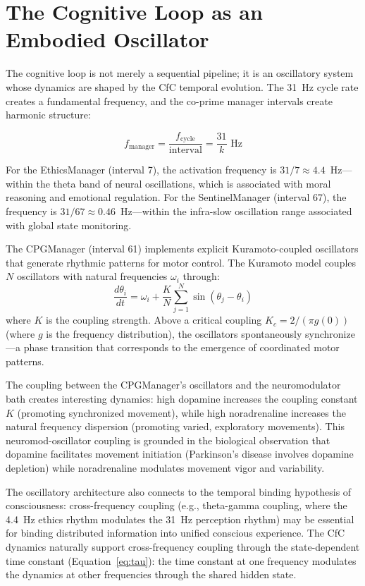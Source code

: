 \documentclass[12pt]{book}
\begin{document}
\section{The Cognitive Loop as an Embodied Oscillator}

The cognitive loop is not merely a sequential pipeline; it is an oscillatory system whose dynamics are shaped by the CfC temporal evolution. The 31~Hz cycle rate creates a fundamental frequency, and the co-prime manager intervals create harmonic structure:

\begin{equation}
f_{\text{manager}} = \frac{f_{\text{cycle}}}{\text{interval}} = \frac{31}{k} \text{ Hz}
\end{equation}

For the EthicsManager (interval 7), the activation frequency is $31/7 \approx 4.4$~Hz---within the theta band of neural oscillations, which is associated with moral reasoning and emotional regulation. For the SentinelManager (interval 67), the frequency is $31/67 \approx 0.46$~Hz---within the infra-slow oscillation range associated with global state monitoring.

The CPGManager (interval 61) implements explicit Kuramoto-coupled oscillators that generate rhythmic patterns for motor control. The Kuramoto model couples $N$ oscillators with natural frequencies $\omega_i$ through:
\begin{equation}
\frac{d\theta_i}{dt} = \omega_i + \frac{K}{N} \sum_{j=1}^{N} \sin(\theta_j - \theta_i)
\end{equation}
where $K$ is the coupling strength. Above a critical coupling $K_c = 2/(\pi g(0))$ (where $g$ is the frequency distribution), the oscillators spontaneously synchronize---a phase transition that corresponds to the emergence of coordinated motor patterns.

The coupling between the CPGManager's oscillators and the neuromodulator bath creates interesting dynamics: high dopamine increases the coupling constant $K$ (promoting synchronized movement), while high noradrenaline increases the natural frequency dispersion (promoting varied, exploratory movements). This neuromod-oscillator coupling is grounded in the biological observation that dopamine facilitates movement initiation (Parkinson's disease involves dopamine depletion) while noradrenaline modulates movement vigor and variability.

The oscillatory architecture also connects to the temporal binding hypothesis of consciousness: cross-frequency coupling (e.g., theta-gamma coupling, where the 4.4~Hz ethics rhythm modulates the 31~Hz perception rhythm) may be essential for binding distributed information into unified conscious experience. The CfC dynamics naturally support cross-frequency coupling through the state-dependent time constant (Equation~\ref{eq:tau}): the time constant at one frequency modulates the dynamics at other frequencies through the shared hidden state.
\end{document}
